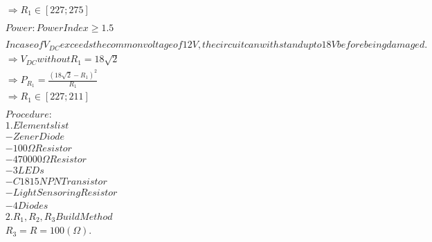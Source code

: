 \documentclass{amsart}
\begin{document}
\begin{align*}
&\Longrightarrow R_1 \in [227 ; 275]\\
\\
&Power: Power Index \geq 1.5\\
\\
&In case of V_{DC} exceeds the common voltage of 12V, the circuit can withstand up to 18V before being damaged.\\
&\Longrightarrow V_{DC} without R_1 = 18\sqrt{2}\\
&\Longrightarrow P_{R_1} = \frac{(18\sqrt{2} - R_1)^2}{R_1}\\
&\Longrightarrow R_1 \in [227 ; 211]\\
\\
&Procedure:\\
&1. Elements list\\
&- Zener Diode\\
&- 100\Omega Resistor\\
&- 470000\Omega Resistor\\
&- 3 LEDs\\
&- C1815 NPN Transistor\\
&- Light Sensoring Resistor\\
&- 4 Diodes\\
&2. R_1, R_2, R_3 Build Method\\
&R_3 = R = 100(\Omega).\\
\end{align*}
\end{document}
